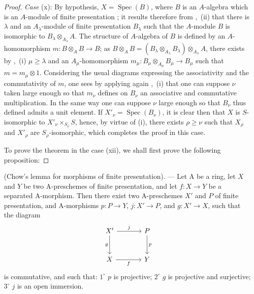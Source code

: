\begin{proof}
\emph{Case} (x): By hypothesis, $X=\operatorname{Spec}(B)$, where $B$ is an $A$-algebra which is an $A$-module of finite presentation ; it results therefore from ,~(ii) that there is $\lambda$ and an $A_\lambda$-module of finite presentation $B_\lambda$ such that the $A$-module $B$ is isomorphic to $B_\lambda\otimes_{A_\lambda}A$.
The structure of $A$-algebra of $B$ is defined by an $A$-homomorphism $m:B\otimes_A B\to B$; as $B\otimes_A B=(B_\lambda\otimes_{A_\lambda}B_\lambda)\otimes_{A_\lambda} A$, there exists by ,~(i) $\mu\geqslant\lambda$ and an $A_\mu$-homomorphism $m_\mu:B_\mu\otimes_{A_\mu}B_\mu\to B_\mu$ such that $m=m_\mu\otimes 1$.
Considering the usual diagrams expressing the associativity and the commutativity of $m$, one sees by applying again ,~(i) that one can suppose $\nu$ taken large enough so that $m_\nu$ defines on $B_\nu$ an associative and commutative multiplication.
In the same way one can suppose $\nu$ large enough so that $B_\nu$ thus defined admits a unit element.
If $X'_\nu=\operatorname{Spec}(B_\nu)$, it is clear then that $X$ is $S$-isomorphic to $X'_\nu\times_{S_\nu}S$, hence, by virtue of (i), there exists $\rho\geqslant\nu$ such that $X_\rho$ and $X'_\rho$ are $S_\rho$-isomorphic, which completes the proof in this case.

To prove the theorem in the case (xii), we shall first prove the following proposition:
\end{proof}

\begin{proposition}[8.10.5.1]
\label{IV.8.10.5.1}
(Chow's lemma for morphisms of finite presentation). --- Let $\mathrm{A}$ be a ring, let $X$ and $Y$ be two $\mathrm{A}$-preschemes of finite presentation, and let $f:X\to Y$ be a separated $\mathrm{A}$-morphism. Then there exist two $\mathrm{A}$-preschemes $X'$ and $P$ of finite presentation, and $\mathrm{A}$-morphisms $p:P\to Y$, $j:X'\to P$, and $g:X'\to X$, such that the diagram
\[
\begin{tikzcd}[column sep=large,row sep=large]
X' \arrow[r,"j"] \arrow[d,"g"'] & P \arrow[d,"p"] \\
X \arrow[r,"f"'] & Y
\end{tikzcd}
\]
is commutative, and such that: $1^\circ$ $p$ is projective; $2^\circ$ $g$ is projective and surjective; $3^\circ$ $j$ is an open immersion.
\end{proposition}

